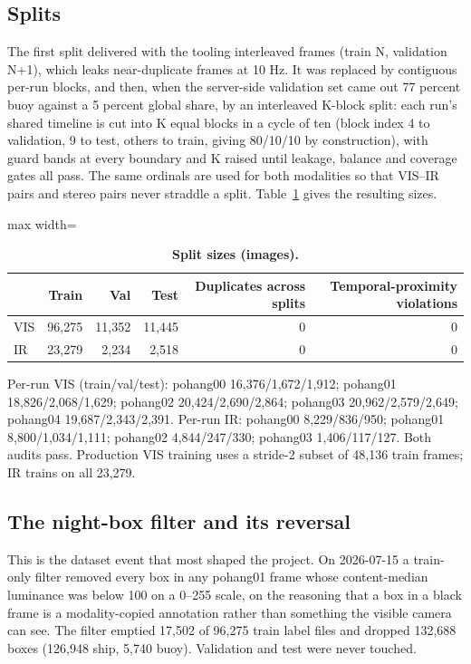 \documentclass[10pt]{article}
\begin{document}
\subsection{Splits}\label{app:B.3}
The first split delivered with the tooling interleaved frames (train N, validation N+1), which leaks near-duplicate frames at 10 Hz. It was replaced by contiguous per-run blocks, and then, when the server-side validation set came out 77 percent buoy against a 5 percent global share, by an interleaved K-block split: each run's shared timeline is cut into K equal blocks in a cycle of ten (block index 4 to validation, 9 to test, others to train, giving 80/10/10 by construction), with guard bands at every boundary and K raised until leakage, balance and coverage gates all pass. The same ordinals are used for both modalities so that VIS--IR pairs and stereo pairs never straddle a split. Table~\ref{tab:S} gives the resulting sizes.

\begin{table}[htbp]
\centering
\footnotesize
\caption{\textbf{Split sizes (images).}}
\label{tab:S}
\begin{adjustbox}{max width=\linewidth}
\begin{tabular}{lrrrrr}
\toprule
 & Train & Val & Test & Duplicates across splits & Temporal-proximity violations \\
\midrule
VIS & 96,275 & 11,352 & 11,445 & 0 & 0 \\
IR & 23,279 & 2,234 & 2,518 & 0 & 0 \\
\bottomrule
\end{tabular}
\end{adjustbox}
\end{table}
Per-run VIS (train/val/test): pohang00 16,376/1,672/1,912; pohang01 18,826/2,068/1,629; pohang02 20,424/2,690/2,864; pohang03 20,962/2,579/2,649; pohang04 19,687/2,343/2,391. Per-run IR: pohang00 8,229/836/950; pohang01 8,800/1,034/1,111; pohang02 4,844/247/330; pohang03 1,406/117/127. Both audits pass. Production VIS training uses a stride-2 subset of 48,136 train frames; IR trains on all 23,279.

\subsection{The night-box filter and its reversal}\label{app:B.4}
This is the dataset event that most shaped the project. On 2026-07-15 a train-only filter removed every box in any pohang01 frame whose content-median luminance was below 100 on a 0--255 scale, on the reasoning that a box in a black frame is a modality-copied annotation rather than something the visible camera can see. The filter emptied 17,502 of 96,275 train label files and dropped 132,688 boxes (126,948 ship, 5,740 buoy). Validation and test were never touched.
\end{document}
